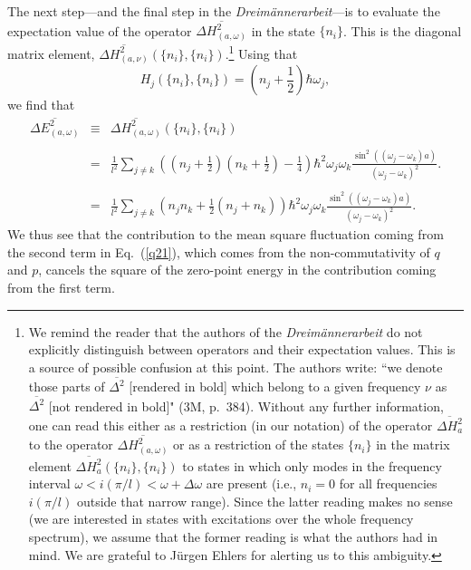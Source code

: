 \documentclass[12pt]{elsart}
\begin{document}
The next step---and the final step in the {\it Dreim\"annerarbeit}---is to evaluate the expectation value of the operator $\overline{\Delta H_{(a, \omega)}^2}$ in the state $\{n_i\}$. This is the diagonal matrix element, $\overline{\Delta H_{(a, \nu)}^2}(\{n_i\}, \{n_i\})$.\footnote{We remind the reader that the authors of the {\it Dreim\"annerarbeit} do not explicitly distinguish between operators and their expectation values. This is a source of possible confusion at this point. The authors write: ``we denote those parts of $\overline{\Delta^2}$ [rendered in bold] which belong to a given frequency $\nu$ as $\overline{\Delta^2}$ [not rendered in bold]" (3M, p.\ 384). Without any further information, one can read this either as a restriction (in our notation) of the operator $\overline{\Delta H_a^2}$ to the operator $\overline{\Delta H_{(a, \omega)}^2}$ or as a restriction of the states $\{ n_i \}$ in the matrix element $\overline{\Delta H_a^2}(\{n_i\}, \{n_i\})$ to states in which only modes in the frequency interval $\omega < i (\pi/l) < \omega+\Delta\omega$ are present (i.e., $n_i = 0$ for all frequencies $i (\pi/l)$ outside that narrow range). Since the latter reading makes no sense (we are interested in states  with excitations over the whole frequency spectrum), we assume that the former reading is what the authors had in mind. We are grateful to J\"urgen Ehlers for alerting us to this ambiguity.} 
Using that
\begin{equation}
H_j(\{ n_i \}, \{ n_i \}) = \left( n_j + \frac{1}{2} \right) \hbar \omega_j,
\label{q21c}
\end{equation}
we find that
\newpage
\begin{eqnarray}
\overline{\Delta E_{(a, \omega)}^2} & \equiv & \overline{\Delta H_{(a, \omega)}^2}(\{n_i\}, \{n_i \}) \nonumber \\
 & & \nonumber \\
& = &   \frac{1}{l^2}  \sum_{j \neq k} \left(  \left( n_j + \frac{1}{2} \right) \left( n_k + \frac{1}{2} \right)  - 
\frac{1}{4} \right) \hbar^2 \omega_j \omega_k     \frac{\sin^2{((\omega_j - \omega_k)a)}}{(\omega_j - \omega_k)^2}.  \nonumber \\
 & & \nonumber \\
 & = & \frac{1}{l^2}  \sum_{j \neq k} \left( n_j n_k + \frac{1}{2} \left( n_j + n_k \right)  \right) \hbar^2 \omega_j \omega_k   \frac{\sin^2{((\omega_j - \omega_k)a)}}{(\omega_j - \omega_k)^2}.
\label{q24} 
 \end{eqnarray}
 We thus see that the contribution to the mean square fluctuation coming from the second term in Eq.\ (\ref{q21}), which comes from the non-commutativity of $q$ and $p$, cancels the square of the zero-point energy in the contribution coming from  the first term.
 
\end{document}
